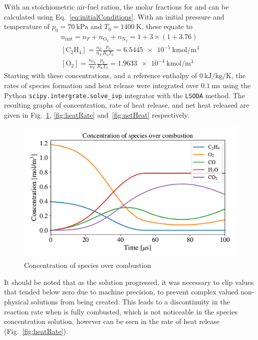 \documentclass[a4paper]{article}
\begin{document}
\newpage
With an stoichiometric air-fuel ration, the molar fractions for  and
 can be calculated using Eq.~\ref{eq:initialConditions}. With an initial
pressure and temperature of \(p_0=\SI{70}{\kPa}\) and \(T_0=\SI{1400}{\K}\),
these equate to
\begin{gather}
	\label{eq:initialConditions}
	n_\text{init} = n_F + n_{\text{O}_2} + n_{\text{N}_2}
	= 1 + 3 \times (1 + 3.76) \\ \nonumber
	[\text{C}_2\text{H}_4] = \frac{n_F}{n_T} \frac{p_0}{R_u T_0}
	= \SI{6.5445e-5}{\kmol\per\m\cubed}
	\\ \nonumber
	[\text{O}_2] = \frac{n_{\text{O}_2}}{n_T} \frac{p_0}{R_u T_0}
	= \SI{1.9633e-4}{\kmol\per\m\cubed}
\end{gather}
Starting with these concentrations, and a reference enthalpy of
\(\SI{0}{\kJ\per\kg\per\K}\), the rates of species formation and heat release
were integrated over \(\SI{0.1}{\ms}\) using the Python
\verb|scipy.intergrate.solve_ivp| integrator with the \verb|LSODA| method. The
resulting graphs of concentration, rate of heat release, and net heat released
are given in Fig.~\ref{fig:concentration}, \ref{fig:heatRate}
and~\ref{fig:netHeat} respectively.

\begin{figure}[H]
	\centering
	\includegraphics[width=0.9\linewidth]{images/concentration.pdf}
	\caption{Concentration of species over combustion}
	\label{fig:concentration}
\end{figure}

It should be noted that as the solution progressed, it was necessary to clip
values that tended below zero due to machine precision, to prevent complex
valued non-physical solutions from being created. This leads to a discontinuity
in the reaction rate when  is fully combusted, which is not noticeable
in the species concentration solution, however can be seen in the rate of heat
release (Fig.~\ref{fig:heatRate}).
\end{document}
